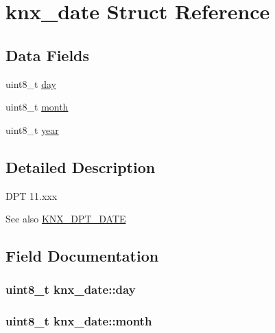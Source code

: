 \hypertarget{structknx__date}{}\section{knx\+\_\+date Struct Reference}
\label{structknx__date}
\subsection*{Data Fields}
\begin{DoxyCompactItemize}
\item 
uint8\+\_\+t \hyperlink{structknx__date_a34b539aa9010e5d4e35009240054bc21}{day}
\item 
uint8\+\_\+t \hyperlink{structknx__date_a31dae9ba9937c5951058c0d346ff5011}{month}
\item 
uint8\+\_\+t \hyperlink{structknx__date_a12fbc4580c575f2fde6a6cfb1342d3bd}{year}
\end{DoxyCompactItemize}


\subsection{Detailed Description}
D\+PT 11.\+xxx \begin{DoxySeeAlso}{See also}
\hyperlink{data_8h_a6e79f8a1b8ff1d0dff30d1fdb401b642a4d25a24d7f09f793b9031b2dda38dd47}{K\+N\+X\+\_\+\+D\+P\+T\+\_\+\+D\+A\+TE} 
\end{DoxySeeAlso}


\subsection{Field Documentation}
\subsubsection[{\texorpdfstring{day}{day}}]{\setlength{\rightskip}{0pt plus 5cm}uint8\+\_\+t knx\+\_\+date\+::day}\hypertarget{structknx__date_a34b539aa9010e5d4e35009240054bc21}{}\label{structknx__date_a34b539aa9010e5d4e35009240054bc21}
\subsubsection[{\texorpdfstring{month}{month}}]{\setlength{\rightskip}{0pt plus 5cm}uint8\+\_\+t knx\+\_\+date\+::month}\hypertarget{structknx__date_a31dae9ba9937c5951058c0d346ff5011}{}\label{structknx__date_a31dae9ba9937c5951058c0d346ff5011}
